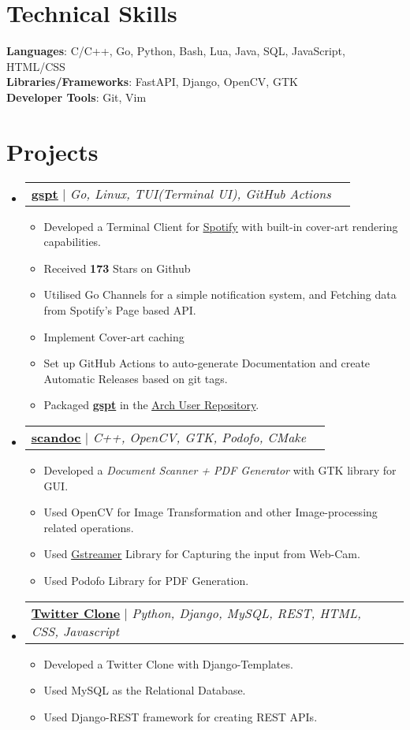 \documentclass[letterpaper,11pt]{article}
\makeatletter
\newcommand{\resumeItem}[1]{
  \item\small{
    {#1 \vspace{-2pt}}
  }
}
\newcommand{\resumeProjectHeading}[2]{
    \item
    \begin{tabular*}{0.97\textwidth}{l@{\extracolsep{\fill}}r}
      \small#1 & #2 \\
    \end{tabular*}\vspace{-7pt}
}
\newcommand{\resumeSubHeadingListStart}{\begin{itemize}[leftmargin=0.15in, label={}]}
\newcommand{\resumeSubHeadingListEnd}{\end{itemize}}
\newcommand{\resumeItemListStart}{\begin{itemize}}
\newcommand{\resumeItemListEnd}{\end{itemize}\vspace{-5pt}}
\makeatother
\begin{document}
\section{Technical Skills}
 \begin{itemize}[leftmargin=0.15in, label={}]
    \small{\item{
     \textbf{Languages}{: C/C++, Go, Python, Bash, Lua, Java, SQL, JavaScript, HTML/CSS} \\
     \textbf{Libraries/Frameworks}{: FastAPI, Django, OpenCV, GTK} \\
     \textbf{Developer Tools}{: Git, Vim} \\
    }}
 \end{itemize}



\section{Projects}
    \resumeSubHeadingListStart
      \resumeProjectHeading
          {\textbf{\href{https://github.com/aditya-K2/gspt}{\underline{gspt}}} $|$ \emph{Go, Linux, TUI(Terminal UI), GitHub Actions}}{}
          \resumeItemListStart
            \resumeItem{Developed a Terminal Client for \href{https://www.spotify.com/}{\underline{Spotify}} with built-in cover-art rendering capabilities.}
            \resumeItem{Received \textbf{173} Stars on Github}
            \resumeItem{Utilised Go Channels for a simple notification system, and Fetching data from Spotify's Page based API.}
            \resumeItem{Implement Cover-art caching}
            \resumeItem{Set up GitHub Actions to auto-generate Documentation and create Automatic Releases based on git tags.}
            \resumeItem{Packaged \href{https://github.com/aditya-K2/gspt}{\textbf{gspt}} in the \href{https://aur.archlinux.org/packages/gspt-git}{\underline{Arch User Repository}}.}
          \resumeItemListEnd
      \resumeProjectHeading
          {\textbf{\href{https://github.com/aditya-K2/scandoc}{\underline{scandoc}}} $|$ \emph{C++, OpenCV, GTK, Podofo, CMake}}{}
          \resumeItemListStart
            \resumeItem{Developed a \textit{Document Scanner + PDF Generator} with GTK library for GUI.}
            \resumeItem{Used OpenCV for Image Transformation and other Image-processing related operations.}
            \resumeItem{Used \href{https://gstreamer.freedesktop.org/}{\underline{Gstreamer}} Library for Capturing the input from Web-Cam.}
            \resumeItem{Used Podofo Library for PDF Generation.}
          \resumeItemListEnd
      \resumeProjectHeading
          {\textbf{\href{https://github.com/aditya-K2/twitterclone}{\underline{Twitter Clone}}} $|$ \emph{Python, Django, MySQL, REST, HTML, CSS, Javascript}}{}
          \resumeItemListStart
            \resumeItem{Developed a Twitter Clone with Django-Templates. }
            \resumeItem{Used MySQL as the Relational Database.}
            \resumeItem{Used Django-REST framework for creating REST APIs.}
          \resumeItemListEnd
    \resumeSubHeadingListEnd
\end{document}
